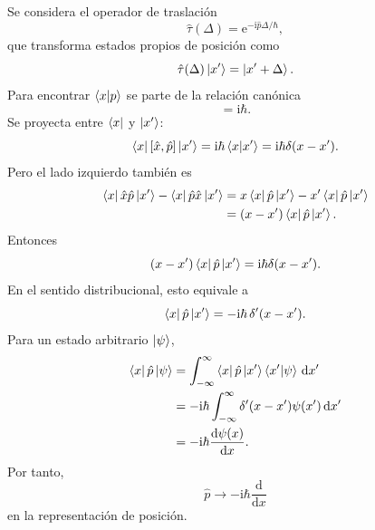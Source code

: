 \documentclass[11pt]{article}
\newcommand{\ii}{\mathrm{i}}
\newcommand{\ee}{\mathrm{e}}
\newcommand{\dd}{\mathrm{d}}
\begin{document}
Se considera el operador de traslaci\'on
\begin{equation}
  \hat \tau(\Delta)=\ee^{-\ii\hat p\Delta/\hbar},
\end{equation}
que transforma estados propios de posici\'on como
\begin{equation}
  \hat\tau(\Delta)\ket{x'}=\ket{x'+\Delta}.
\end{equation}
Para encontrar $\braket{x|p}$ se parte de la relaci\'on can\'onica
\begin{equation}
  [\hat x,\hat p]=\ii\hbar.
\end{equation}
Se proyecta entre $\bra{x}$ y $\ket{x'}$:
\begin{equation}
  \bra{x}[\hat x,\hat p]\ket{x'}
  =
  \ii\hbar\braket{x|x'}
  =
  \ii\hbar\delta(x-x').
\end{equation}
Pero el lado izquierdo tambi\'en es
\begin{align}
  \bra{x}\hat x\hat p\ket{x'}
  -
  \bra{x}\hat p\hat x\ket{x'}
  &=
  x\bra{x}\hat p\ket{x'}
  -
  x'\bra{x}\hat p\ket{x'}\\
  &=
  (x-x')\bra{x}\hat p\ket{x'}.
\end{align}
Entonces
\begin{equation}
  (x-x')\bra{x}\hat p\ket{x'}
  =
  \ii\hbar\delta(x-x').
\end{equation}
En el sentido distribucional, esto equivale a
\begin{equation}
  \bra{x}\hat p\ket{x'}=-\ii\hbar\,\delta'(x-x').
\end{equation}
Para un estado arbitrario $\ket\psi$,
\begin{align}
  \bra{x}\hat p\ket\psi
  &=
  \int_{-\infty}^{\infty}
  \bra{x}\hat p\ket{x'}\braket{x'|\psi}\,\dd x'\\
  &=
  -\ii\hbar
  \int_{-\infty}^{\infty}
  \delta'(x-x')\psi(x')\,\dd x'\\
  &=
  -\ii\hbar\frac{\dd\psi(x)}{\dd x}.
\end{align}
Por tanto,
\begin{equation}
  \boxed{\hat p\to -\ii\hbar\frac{\dd}{\dd x}}
\end{equation}
en la representaci\'on de posici\'on.
\end{document}
